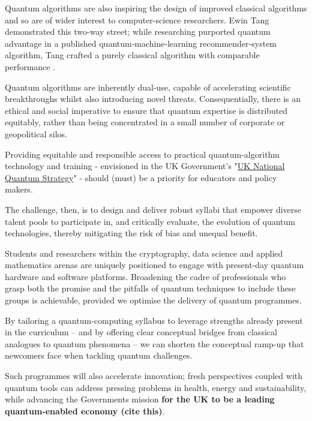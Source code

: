Quantum algorithms are also inspiring the design of improved classical algorithms 
and so are of wider interest to computer-science researchers.  
Ewin Tang demonstrated this two-way street;
while researching purported quantum advantage in a published quantum‑machine‑learning recommender‑system algorithm,
Tang crafted a purely classical algorithm with comparable performance \cite{Tang:2019}.

Quantum algorithms are inherently dual-use, capable of accelerating scientific breakthroughs whilst also introducing novel threats. 
Consequentially, there is an ethical and social imperative to ensure that quantum expertise is distributed equitably,
rather than being concentrated in a small number of corporate or geopolitical silos.

Providing equitable and responsible access to practical quantum-algorithm technology and training
- envisioned in the UK Government's "\href{https://www.gov.uk/government/publications/national-quantum-strategy?lang=en-gb}{UK National Quantum Strategy}" -
should (must) be a priority for educators and policy makers. 

The challenge, then, is to design and deliver robust syllabi that empower diverse talent pools to 
participate in, and critically evaluate, the evolution of quantum technologies, 
thereby mitigating the risk of bias and unequal benefit.

Students and researchers within the cryptography, data science and applied mathematics arenas 
are uniquely positioned to engage with present-day quantum hardware and software platforms.
Broadening the cadre of professionals who grasp both the promise and the pitfalls of quantum techniques to include these groups 
is achievable, provided we optimise the delivery of quantum programmes.

By tailoring a quantum-computing syllabus to leverage strengths already present in the curriculum 
-- and by offering clear conceptual bridges from classical analogues to quantum phenomena 
-- 
we can shorten the conceptual ramp-up that newcomers face when tackling quantum challenges.

Such programmes will also accelerate innovation; 
fresh perspectives coupled with quantum tools can address pressing problems in health, energy and sustainability,
while advancing the Governments mission \textbf{for the UK to be a leading quantum-enabled economy (cite this)}.

